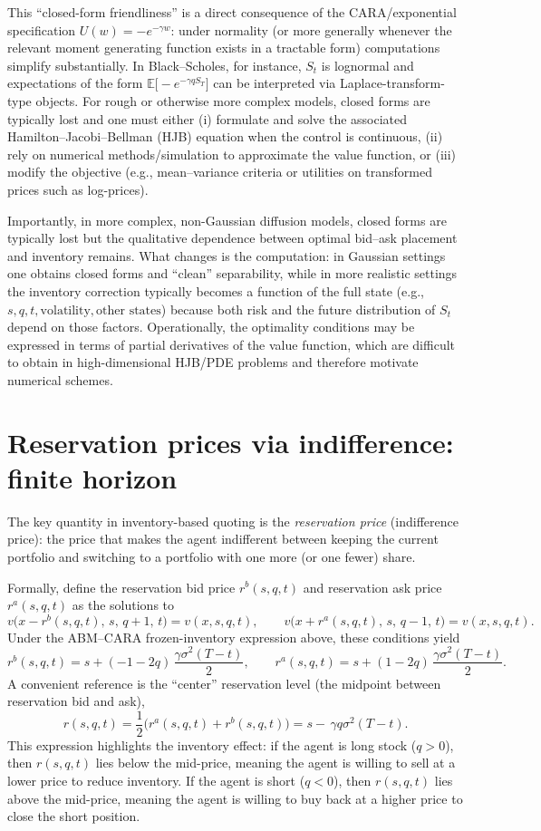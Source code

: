 \documentclass[a4paper,10pt,titlepage,oneside,openany]{book}
\theoremstyle{plain}\newtheorem{theorem}{Theorem}[chapter]
\theoremstyle{definition}\newtheorem{definition}{Definition}[chapter]
\theoremstyle{remark}\newtheorem{remark}{Remark}[chapter]
\begin{document}
This ``closed-form friendliness'' is a direct consequence of the CARA/exponential specification $U(w)=-e^{-\gamma w}$: under normality (or more generally whenever the relevant moment generating function exists in a tractable form) computations simplify substantially. In Black--Scholes, for instance, $S_t$ is lognormal and expectations of the form $\mathbb{E}\bigl[-e^{-\gamma q S_T}\bigr]$ can be interpreted via Laplace-transform-type objects. For rough or otherwise more complex models, closed forms are typically lost and one must either (i) formulate and solve the associated Hamilton--Jacobi--Bellman (HJB) equation when the control is continuous, (ii) rely on numerical methods/simulation to approximate the value function, or (iii) modify the objective (e.g., mean--variance criteria or utilities on transformed prices such as log-prices).

Importantly, in more complex, non-Gaussian diffusion models, closed forms are typically lost but the qualitative dependence between optimal bid--ask placement and inventory remains. What changes is the computation: in Gaussian settings one obtains closed forms and ``clean'' separability, while in more realistic settings the inventory correction typically becomes a function of the full state (e.g., $s,q,t,\text{volatility},\text{other states}$) because both risk and the future distribution of $S_t$ depend on those factors. Operationally, the optimality conditions may be expressed in terms of partial derivatives of the value function, which are difficult to obtain in high-dimensional HJB/PDE problems and therefore motivate numerical schemes.

\section{Reservation prices via indifference: finite horizon}
The key quantity in inventory-based quoting is the \emph{reservation price} (indifference price): the price that makes the agent indifferent between keeping the current portfolio and switching to a portfolio with one more (or one fewer) share.

Formally, define the reservation bid price $r^b(s,q,t)$ and reservation ask price $r^a(s,q,t)$ as the solutions to
\[
v\bigl(x-r^b(s,q,t),\,s,\,q+1,\,t\bigr)=v(x,s,q,t),
\qquad
v\bigl(x+r^a(s,q,t),\,s,\,q-1,\,t\bigr)=v(x,s,q,t).
\]
Under the ABM--CARA frozen-inventory expression above, these conditions yield
\[
r^b(s,q,t)
=
s+(-1-2q)\,\frac{\gamma\sigma^2(T-t)}{2},
\qquad
r^a(s,q,t)
=
s+(1-2q)\,\frac{\gamma\sigma^2(T-t)}{2}.
\]
A convenient reference is the ``center'' reservation level (the midpoint between reservation bid and ask),
\[
r(s,q,t)
=
\frac12\bigl(r^a(s,q,t)+r^b(s,q,t)\bigr)
=
s-\,\gamma q\sigma^2(T-t).
\]
This expression highlights the inventory effect: if the agent is long stock ($q>0$), then $r(s,q,t)$ lies below the mid-price, meaning the agent is willing to sell at a lower price to reduce inventory. If the agent is short ($q<0$), then $r(s,q,t)$ lies above the mid-price, meaning the agent is willing to buy back at a higher price to close the short position.
\end{document}
